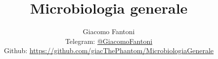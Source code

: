 

\title{\Huge \textbf{Microbiologia generale}}

\author{
  Giacomo Fantoni \\
  \small Telegram: \href{https://t.me/GiacomoFantoni}{@GiacomoFantoni} \\[3pt]
  \small Github: \href{https://github.com/giacThePhantom/MicrobiologiaGenerale}{https://github.com/giacThePhantom/MicrobiologiaGenerale}}

\maketitle
\tableofcontents


